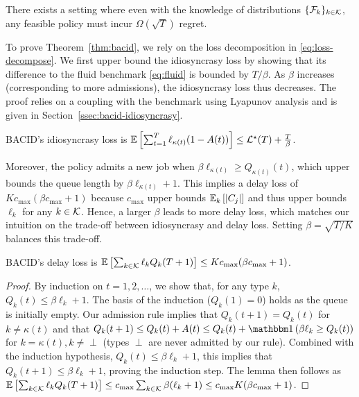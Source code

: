 \begin{theorem}\label{thm:lower-bound}
There exists a setting where even with the knowledge of distributions $\{\mathcal{F}_k\}_{k \in \mathcal{K}}$, any feasible policy must incur $\Omega(\sqrt{T})$ regret.
\end{theorem}

To prove Theorem~\ref{thm:bacid}, we rely on the loss decomposition in \eqref{eq:loss-decompose}. 
 We first upper bound the idiosyncrasy loss by showing that its difference to the fluid benchmark \eqref{eq:fluid} is bounded by $T/\beta$. 
 As $\beta$ increases (corresponding to more admissions), the idiosyncrasy loss thus decreases. The proof relies on a coupling with the benchmark using Lyapunov analysis and is given in Section~\ref{ssec:bacid-idiosyncrasy}. 
 \begin{lemma}\label{lem:known-idiosyncrasy}
\textsc{BACID}'s idiosyncrasy loss is
$\mathbb E\left[\sum_{t=1}^T  \ell_{\kappa(t)}(1 - A(t))\right] \leq \mathcal{L}^\star(T)+\frac{T}{\beta}$.
\end{lemma}

Moreover, the policy admits a new job when $\beta \ell_{\kappa(t)} \geq Q_{\kappa(t)}(t)$, which upper bounds the queue length by $\beta \ell_{\kappa(t)} + 1$. This implies a delay loss of $Kc_{\max}(\beta c_{\max}+1)$ because $c_{\max}$ upper bounds $\mathbb E_{k}\left[|C_j|\right]$ and thus upper bounds $\ell_k$ for any $k \in \mathcal{K}$. Hence, a larger $\beta$ leads to more delay loss, which matches our intuition on the trade-off between idiosyncrasy and delay loss. Setting $\beta = \sqrt{T/K}$ balances this trade-off.

\begin{lemma}\label{lem:known-delay}
\textsc{BACID}'s delay loss is
$\mathbb E\left[\sum_{k \in \mathcal{K}} \ell_k Q_k(T+1)\right] \leq Kc_{\max} (\beta c_{\max}+1)$.
\end{lemma}
\begin{proof}
By induction on $t=1,2,\ldots$, we show that, for any type $k$, $Q_k(t) \leq \beta \ell_k + 1$. The basis of the induction ($Q_k(1) = 0$) holds as the queue is initially empty. Our admission rule implies that $Q_k(t+1) = Q_k(t)$ for $k \neq \kappa(t)$ and that $Q_{k}(t+1)\leq Q_{k}(t) + A(t) \leq Q_{k}(t) + \indic{\beta \ell_{k} \geq Q_k(t)}$ for $k = \kappa(t), k \neq \perp$ (types $\perp$ are never admitted by our rule). Combined with the induction hypothesis, $Q_k(t) \leq \beta \ell_k + 1$, this implies that $Q_k(t+1) \leq \beta \ell_k + 1$, proving the induction step. The lemma then follows as $\mathbb E\left[\sum_{k \in \mathcal{K}} \ell_k Q_k(T+1)\right] \leq c_{\max}\sum_{k\in \mathcal{K}} \beta (\ell_k + 1) \leq c_{\max}K(\beta c_{\max}+1)$.
\end{proof}

